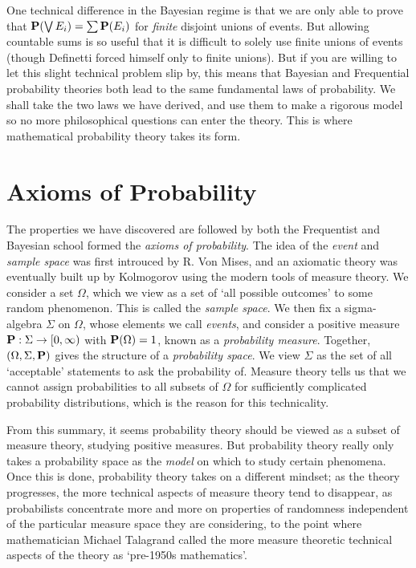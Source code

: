 %
One technical difference in the Bayesian regime is that we are only able to prove that $\mathbf{P}(\bigvee E_i) = \sum \mathbf{P}(E_i)$ for \emph{finite} disjoint unions of events. But allowing countable sums is so useful that it is difficult to solely use finite unions of events (though Definetti forced himself only to finite unions). But if you are willing to let this slight technical problem slip by, this means that Bayesian and Frequential probability theories both lead to the same fundamental laws of probability. We shall take the two laws we have derived, and use them to make a rigorous model so no more philosophical questions can enter the theory. This is where mathematical probability theory takes its form.

\section{Axioms of Probability}

The properties we have discovered are followed by both the Frequentist and Bayesian school formed the \emph{axioms of probability}. The idea of the \emph{event} and \emph{sample space} was first introuced by R. Von Mises, and an axiomatic theory was eventually built up by Kolmogorov using the modern tools of measure theory. We consider a set $\Omega$, which we view as a set of `all possible outcomes' to some random phenomenon. This is called the \emph{sample space}. We then fix a sigma-algebra $\Sigma$ on $\Omega$, whose elements we call \emph{events}, and consider a positive measure $\mathbf{P}: \Sigma \to [0,\infty)$ with $\mathbf{P}(\Omega) = 1$, known as a \emph{probability measure}. Together, $(\Omega, \Sigma, \mathbf{P})$ gives the structure of a \emph{probability space}. We view $\Sigma$ as the set of all `acceptable' statements to ask the probability of. Measure theory tells us that we cannot assign probabilities to all subsets of $\Omega$ for sufficiently complicated probability distributions, which is the reason for this technicality.

From this summary, it seems probability theory should be viewed as a subset of measure theory, studying positive measures. But probability theory really only takes a probability space as the \emph{model} on which to study certain phenomena. Once this is done, probability theory takes on a different mindset; as the theory progresses, the more technical aspects of measure theory tend to disappear, as probabilists concentrate more and more on properties of randomness independent of the particular measure space they are considering, to the point where mathematician Michael Talagrand called the more measure theoretic technical aspects of the theory as `pre-1950s mathematics'.

